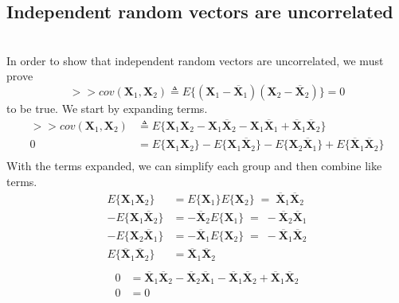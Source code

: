 \documentclass[12pt,letterpaper, onecolumn]{exam}
\begin{document}
\begin{questions}
\begin{parts}
        \part{Independent random vectors are uncorrelated}\\
		        \solution
		        In order to show that independent random vectors are uncorrelated, we must prove
		        \[>>cov(\mathbf{X}_1,\mathbf{X}_2)\triangleq E\{(\mathbf{X}_1 - \overline{\mathbf{X}}_1)(\mathbf{X}_2 - \overline{\mathbf{X}}_2)\} = 0\]
		        to be true. We start by expanding terms.
		        \begin{equation}
		            \begin{split}
		                >>cov(\mathbf{X}_1,\mathbf{X}_2) & \triangleq E\{\mathbf{X}_1\mathbf{X}_2 - \mathbf{X}_1\overline{\mathbf{X}}_2 - \mathbf{X}_1\overline{\mathbf{X}}_1 + \overline{\mathbf{X}}_1\overline{\mathbf{X}}_2\}\\
		                0 & = E\{\mathbf{X}_1\mathbf{X}_2\} - E\{\mathbf{X}_1\overline{\mathbf{X}}_2\} - E\{\mathbf{X}_2\overline{\mathbf{X}}_1\} + E\{\overline{\mathbf{X}}_1\overline{\mathbf{X}}_2\}\\
		            \end{split}
		        \end{equation}
		        With the terms expanded, we can simplify each group and then combine like terms.
		        \begin{equation}
		            \begin{split}
		                E\{\mathbf{X}_1\mathbf{X}_2\} & = E\{\mathbf{X}_1\}E\{\mathbf{X}_2\}\; = \;\overline{\mathbf{X}}_1\overline{\mathbf{X}}_2\\
		                -E\{\mathbf{X}_1\overline{\mathbf{X}}_2\} & = -\overline{\mathbf{X}}_2E\{\mathbf{X}_1\} \; = \;-\overline{\mathbf{X}}_2\overline{\mathbf{X}}_1 \\
		                -E\{\mathbf{X}_2\overline{\mathbf{X}}_1\} & = -\overline{\mathbf{X}}_1E\{\mathbf{X}_2\} \; = \;-\overline{\mathbf{X}}_1\overline{\mathbf{X}}_2 \\
		                E\{\overline{\mathbf{X}}_1\overline{\mathbf{X}}_2\} & = \overline{\mathbf{X}}_1\overline{\mathbf{X}}_2\\
		            \end{split}
		        \end{equation}
		        \begin{equation}
		            \begin{split}
		                0 & = \overline{\mathbf{X}}_1\overline{\mathbf{X}}_2 -\overline{\mathbf{X}}_2\overline{\mathbf{X}}_1 -\overline{\mathbf{X}}_1\overline{\mathbf{X}}_2 + \overline{\mathbf{X}}_1\overline{\mathbf{X}}_2\\
		                0 & = 0\\
		            \end{split}
		        \end{equation}

\end{parts}
\end{questions}
\end{document}
